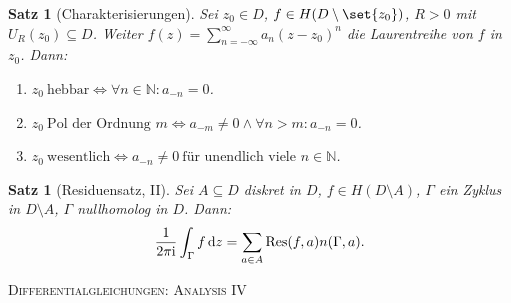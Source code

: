 \documentclass[a4paper]{article}
\theoremstyle{marginbreak}
\newtheorem{satz}[definition]{Satz}
\renewcommand{\i}{\mathrm{i}}
\begin{document}
	\begin{satz}[Charakterisierungen]
		Sei $z_0\in D$, $f\in H(D\setminus\set{z_0})$, $R>0$ mit $U_R(z_0)\subseteq D$. Weiter
		$f(z)=\sum_{n=-\infty}^\infty a_n(z-z_0)^n$ die Laurentreihe von $f$ in $z_0$. Dann:
		\begin{enumerate}[label=(\alph*)]
			\item $z_0~\text{hebbar}\iff\forall n\in\mathbb{N}: a_{-n}=0$.
			\item $z_0~\text{Pol der Ordnung $m$}\iff a_{-m}\neq 0\wedge\forall n>m: a_{-n}=0$.
			\item $z_0~\text{wesentlich}\iff a_{-n}\neq 0~\text{für unendlich viele $n\in\mathbb{N}$}$.
		\end{enumerate}
	\end{satz}
	\begin{satz}[Residuensatz, II]
		Sei $A\subseteq D$ diskret in $D$, $f\in H(D\setminus A)$, $\Gamma$ ein Zyklus in $D\setminus A$,
		$\Gamma$ nullhomolog in $D$. Dann:
		\[
			\frac{1}{2\pi\i}\int_\Gamma f\dd{z}=\sum_{a\in A}\Res(f, a)n(\Gamma, a).
		\]
	\end{satz}
	\newpage
	\textsc{Differentialgleichungen: Analysis IV}
\end{document}
